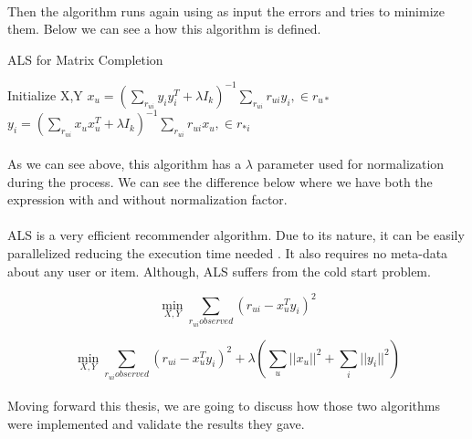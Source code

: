 \paragraph{}Then the algorithm runs again using as input the errors and tries to minimize them. Below we can see a how this algorithm is defined. \\

\begin{algorithm}
	\caption{ALS for Matrix Completion}\label{ALS}
	\begin{algorithmic}[1]
		\State Initialize X,Y
		\Repeat
		\State $x_{u} = (\sum_{r_{ui}}y_{i}y_{i}^{T} + \lambda I_k)^{-1} \sum_{r_{ui}}r_{ui}y_{i} ,\in r_{u*}$
		\EndFor
		\State $y_{i} = (\sum_{r_{ui}}x_{u}x_{u}^{T} + \lambda I_k)^{-1} \sum_{r_{ui}}r_{ui}x_{u} ,\in r_{*i}$
		\EndFor
	\end{algorithmic}
\end{algorithm}

\paragraph{}As we can see above, this algorithm has a $\lambda$ parameter used for normalization during the process. We can see the difference below where we have both the expression with and without normalization factor.

\paragraph{} ALS is a very efficient recommender algorithm. Due to its nature, it can be easily parallelized reducing the execution time needed \cite{DistributedAlgorithmsAndOptimization:4}. It also requires no meta-data about any user or item. Although, ALS suffers from the cold start problem.

\begin{equation}
	\min_{X,Y} \sum_{r_{ui}observed}(r_{ui}-x_{u}^{T}y_{i})^{2}
\end{equation}

\begin{equation}
	\min_{X,Y} \sum_{r_{ui}observed}(r_{ui}-x_{u}^{T}y_{i})^{2} + \lambda(\sum_{u}||x_{u}||^2 + \sum_{i}||y_{i}||^2)
\end{equation}

\paragraph{} Moving forward this thesis, we are going to discuss how those two algorithms were implemented and validate the results they gave.